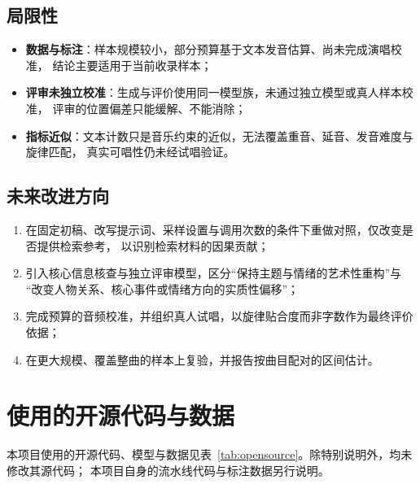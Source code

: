 \documentclass[12pt, a4paper]{ctexart}
\numberwithin{table}{section}
\numberwithin{figure}{section}
\begin{document}
\subsection{局限性}
\begin{itemize}[leftmargin=2em]
  \item \textbf{数据与标注}：样本规模较小，部分预算基于文本发音估算、尚未完成演唱校准，
        结论主要适用于当前收录样本；
  \item \textbf{评审未独立校准}：生成与评价使用同一模型族，未通过独立模型或真人样本校准，
        评审的位置偏差只能缓解、不能消除；
  \item \textbf{指标近似}：文本计数只是音乐约束的近似，无法覆盖重音、延音、发音难度与旋律匹配，
        真实可唱性仍未经试唱验证。
\end{itemize}

\subsection{未来改进方向}
\begin{enumerate}[leftmargin=2em]
  \item 在固定初稿、改写提示词、采样设置与调用次数的条件下重做对照，仅改变是否提供检索参考，
        以识别检索材料的因果贡献；
  \item 引入核心信息核查与独立评审模型，区分“保持主题与情绪的艺术性重构”与
        “改变人物关系、核心事件或情绪方向的实质性偏移”；
  \item 完成预算的音频校准，并组织真人试唱，以旋律贴合度而非字数作为最终评价依据；
  \item 在更大规模、覆盖整曲的样本上复验，并报告按曲目配对的区间估计。
\end{enumerate}

\newpage




\newpage
\appendix
\section{使用的开源代码与数据}
本项目使用的开源代码、模型与数据见表~\ref{tab:opensource}。除特别说明外，均未修改其源代码；
本项目自身的流水线代码与标注数据另行说明。
\end{document}

